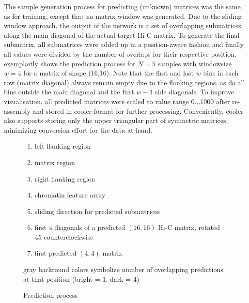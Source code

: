 The sample generation process for predicting (unknown) matrices was the same as for training,
except that no matrix window was generated.
Due to the sliding window approach, the output of the network is a set of overlapping submatrices along the main diagonal of the actual target Hi-C matrix.
To generate the final submatrix, all submatrices were added up in a position-aware fashion 
and finally all values were divided by the number of overlaps for their respective position.
 exemplarily shows the prediction process for $N=5$ samples with windowsize $w=4$ for a matrix of shape (16,16).
Note that the first and last $w$ bins in each row (matrix diagonal) always remain empty due to the flanking regions,
as do all bins outside the main diagonal and the first $w-1$ side diagonals.
To improve visualisation, all predicted matrices were scaled to value range 0...1000 after re-assembly and stored in cooler format for further processing.
Conveniently, cooler also supports storing only the upper triangular part of symmetric matrices, minimizing conversion effort for the data at hand.

\begin{figure}
 \begin{minipage}{0.65\textwidth}
    \caption{Prediction process}
    \label{fig:methods:prediction}
 \end{minipage}\hfill
 \begin{minipage}{0.3\textwidth}
 \scriptsize
  \begin{enumerate}[label=\Alph*:,leftmargin=*]
   \raggedright
    \item left flanking region
    \item matrix region
    \item right flanking region
    \item chromatin feature array
    \item sliding direction for predicted submatrices
    \item first 4 diagonals of a predicted $(16, 16)$ Hi-C matrix, rotated \SI{45}{\deg} counterclockwise
    \item first predicted $(4, 4)$ matrix
\end{enumerate}
\raggedright{gray backround colors symbolize number of overlapping predictions at that position (bright = 1, dark = 4)}
 \end{minipage}
\end{figure}


